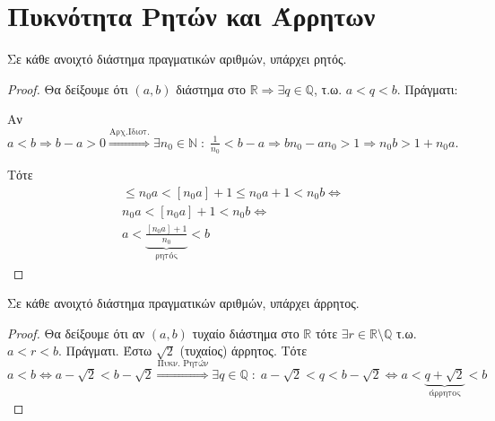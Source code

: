 \documentclass[main.tex]{subfiles}
\begin{document}
\section{Πυκνότητα Ρητών και Άρρητων}

\begin{mypropbox}
Σε κάθε ανοιχτό διάστημα πραγματικών αριθμών, υπάρχει ρητός.
\end{mypropbox}

\begin{proof}
\item {}
  Θα δείξουμε ότι $ (a,b) $ διάστημα στο $ \mathbb{R} \Rightarrow \exists q 
  \in \mathbb{Q} $, τ.ω. $ a < q < b $. Πράγματι:

  Αν $ a<b \Rightarrow b-a >0 \overset{\text{Αρχ.Ιδιοτ.}}{\Rightarrow} \exists 
  n_{0} \in \mathbb{N} \; : \; \frac{1}{n_{0}} < b-a \Rightarrow b n_{0} - a n_{0} 
  >1 \Rightarrow n_{0}b > 1+ n_{0}a$.

  Τότε 
  \begin{gather*}
    [n_{0}a] \leq n_{0}a < [n_{0}a]+1 \leq n_{0}a +1 < n_{0}b \Leftrightarrow \\
    n_{0}a < [n_{0}a]+1 < n_{0}b \Leftrightarrow \\
    a < \underbrace{\frac{[n_{0}a]+1}{n_{0}}}_{\text{ρητός}}< b
  \end{gather*}
\end{proof}

\begin{mypropbox}
Σε κάθε ανοιχτό διάστημα πραγματικών αριθμών, υπάρχει άρρητος.
\end{mypropbox}

\begin{proof}
\item {}
  Θα δείξουμε ότι αν $ (a,b) $ τυχαίο διάστημα στο $ \mathbb{R} $ τότε 
  $ \exists r \in \mathbb{R} \setminus \mathbb{Q} $ τ.ω. $a < r < b$. Πράγματι.
  Έστω $ \sqrt{2} $ (τυχαίος) άρρητος. Τότε
  $ a < b \Leftrightarrow a - \sqrt{2} < b- \sqrt{2} \overset{\text{Πυκν. Ρητών}}{\Rightarrow} \exists q \in \mathbb{Q} \; : \;  a - \sqrt{2} < q < b - 
  \sqrt{2} \Leftrightarrow  a < \underbrace{q + \sqrt{2}}_{\text{άρρητος}} < b $ 
\end{proof}
\end{document}
